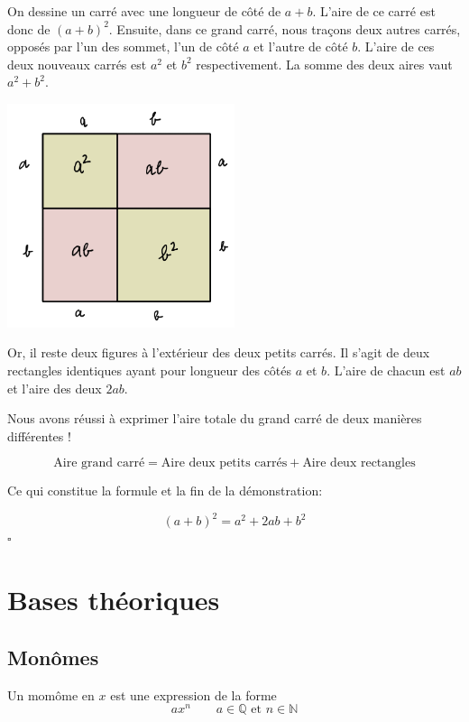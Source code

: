 \documentclass[
  12pt,
]{book}
\begin{document}
On dessine un carré avec une longueur de côté de \(a+b\). L'aire de ce carré est donc de \((a+b)^2\). Ensuite, dans ce grand carré, nous traçons deux autres carrés, opposés par l'un des sommet, l'un de côté \(a\) et l'autre de côté \(b\). L'aire de ces deux nouveaux carrés est \(a^2\) et \(b^2\) respectivement. La somme des deux aires vaut \(a^2+b^2\).

\includegraphics[width=0.5\textwidth,height=\textheight]{c02i001.png}

Or, il reste deux figures à l'extérieur des deux petits carrés. Il s'agit de deux rectangles identiques ayant pour longueur des côtés \(a\) et \(b\). L'aire de chacun est \(ab\) et l'aire des deux \(2ab\).

Nous avons réussi à exprimer l'aire totale du grand carré de deux manières différentes !

\[\text{Aire grand carré}=\text{Aire deux petits carrés} + \text{Aire deux rectangles}\]

Ce qui constitue la formule et la fin de la démonstration:

\[(a+b)^2 = a^2+2ab+b^2\]
\(\square\)

\hypertarget{bases-thuxe9oriques-1}{%
\section{Bases théoriques}\label{bases-thuxe9oriques-1}}

\hypertarget{monuxf4mes}{%
\subsection{Monômes}\label{monuxf4mes}}

\begin{defbox}
Un momôme en \(x\) est une expression de la forme
\[ax^n\qquad a\in\mathbb{Q}\text{ et } n\in\mathbb{N}\]

\end{defbox}
\end{document}
